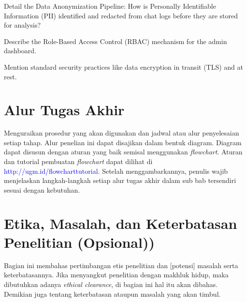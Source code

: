 Detail the Data Anonymization Pipeline: How is Personally Identifiable Information (PII) identified and redacted from chat logs before they are stored for analysis?

Describe the Role-Based Access Control (RBAC) mechanism for the admin dashboard.

Mention standard security practices like data encryption in transit (TLS) and at rest.

\section{Alur Tugas Akhir}

Menguraikan prosedur yang akan digunakan dan jadwal atau alur penyelesaian setiap 
tahap. Alur penelian ini dapat disajikan dalam bentuk diagram. Diagram dapat disusun dengan aturan yang baik semisal menggunakan \textit{flowchart}. Aturan dan tutorial pembuatan \textit{flowchart} dapat dilihat di \textcolor{blue}{http://ugm.id/flowcharttutorial}. Setelah menggambarkannya, penulis wajib menjelaskan langkah-langkah setiap alur tugas akhir dalam sub bab tersendiri sesuai dengan kebutuhan.

\section{Etika, Masalah, dan Keterbatasan Penelitian (Opsional))}

Bagian ini membahas pertimbangan etis penelitian dan [potensi] masalah serta
keterbatasannya. Jika menyangkut penelitian dengan makhluk hidup, maka dibutuhkan adanya \textit{ethical clearance}, di bagian ini hal itu akan dibahas. Demikian juga tentang keterbatasan ataupun masalah yang akan timbul.
